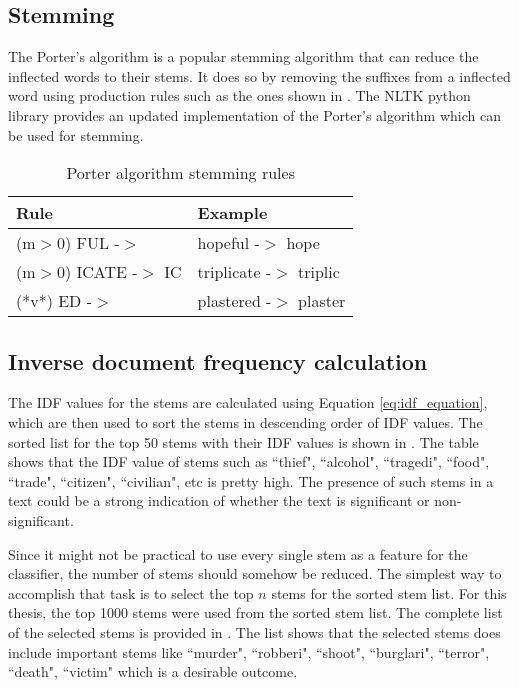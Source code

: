 \subsection{Stemming}
The Porter's algorithm\cite{porter1980algorithm} is a popular stemming algorithm that can reduce the inflected words to their stems. It does so by removing the suffixes from a inflected word using production rules such as the ones shown in . The NLTK python library provides an updated implementation of the Porter's algorithm which can be used for stemming.

\begin{table}
    \centering
    \caption{Porter algorithm stemming rules}
    \label{tbl:porter_algo}
    \begin{tabular}{p{4cm}p{4cm}}
    \toprule
    Rule&Example \\
    \midrule
    (m$>$0) FUL -$>$  &  hopeful -$>$ hope \\
    (m$>$0) ICATE -$>$ IC  & triplicate -$>$ triplic \\
    (*v*) ED -$>$ & plastered -$>$ plaster \\
    \bottomrule
    \end{tabular}
\end{table}

\subsection{Inverse document frequency calculation}
The IDF values for the stems are calculated using Equation \eqref{eq:idf_equation}, which are then used to sort the stems in descending order of IDF values. The sorted list for the top 50 stems with their IDF values is shown in . The table shows that the IDF value of stems such as ``thief", ``alcohol", ``tragedi", ``food", ``trade", ``citizen", ``civilian", etc is pretty high. The presence of such stems in a text could be a strong indication of whether the text is significant or non-significant.

Since it might not be practical to use every single stem as a feature for the classifier, the number of stems should somehow be reduced. The simplest way to accomplish that task is to select the top $n$ stems for the sorted stem list. For this thesis, the top 1000 stems were used from the sorted stem list. The complete list of the selected stems is provided in . The list shows that the selected stems does include important stems like ``murder", ``robberi", ``shoot", ``burglari", ``terror", ``death", ``victim" which is a desirable outcome.

